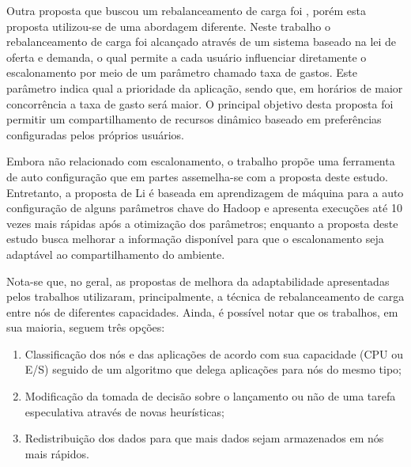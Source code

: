Outra proposta que buscou um rebalanceamento de carga foi \citet{Sandholm2009}, porém esta proposta utilizou-se de uma abordagem diferente. Neste trabalho o rebalanceamento de carga foi alcançado através de um sistema baseado na lei de oferta e demanda, o qual permite a cada usuário influenciar diretamente o escalonamento por meio de um parâmetro chamado taxa de gastos. Este parâmetro indica qual a prioridade da aplicação, sendo que, em horários de maior concorrência a taxa de gasto será maior. O principal objetivo desta proposta foi permitir um compartilhamento de recursos dinâmico baseado em preferências configuradas pelos próprios usuários.

Embora não relacionado com escalonamento, o trabalho \citet{Li} propõe uma ferramenta de auto configuração que em partes assemelha-se com a proposta deste estudo. Entretanto, a proposta de Li é baseada em aprendizagem de máquina para a auto configuração de alguns parâmetros chave do Hadoop e apresenta execuções até 10 vezes mais rápidas após a otimização dos parâmetros; enquanto a proposta deste estudo busca melhorar a informação disponível para que o escalonamento seja adaptável ao compartilhamento do ambiente.

Nota-se que, no geral, as propostas de melhora da adaptabilidade apresentadas pelos trabalhos utilizaram, principalmente, a técnica de rebalanceamento de carga entre nós de diferentes capacidades. Ainda, é possível notar que os trabalhos, em sua maioria, seguem três opções:

\begin{enumerate}
	\item Classificação dos nós e das aplicações de acordo com sua capacidade (CPU ou E/S) seguido de um algoritmo que delega aplicações para nós do mesmo tipo;
	\item Modificação da tomada de decisão sobre o lançamento ou não de uma tarefa especulativa através de novas heurísticas;
	\item Redistribuição dos dados para que mais dados sejam armazenados em nós mais rápidos.
\end{enumerate}

